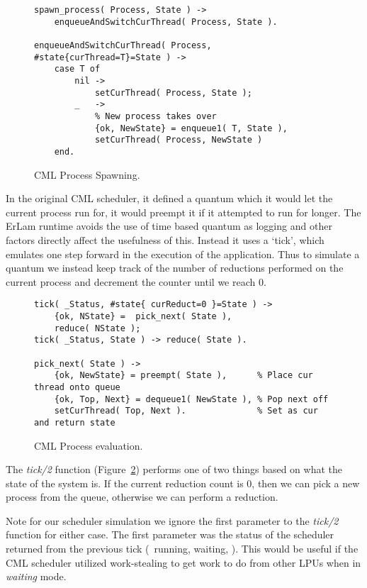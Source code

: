 \begin{figure}
\begin{verbatim}
spawn_process( Process, State ) -> 
    enqueueAndSwitchCurThread( Process, State ).

enqueueAndSwitchCurThread( Process, #state{curThread=T}=State ) ->
    case T of
        nil ->
            setCurThread( Process, State );
        _   ->
            % New process takes over
            {ok, NewState} = enqueue1( T, State ), 
            setCurThread( Process, NewState )
    end.
\end{verbatim}
\caption{CML Process Spawning.}
\label{fig:cml-spawn-process}
\end{figure}

In the original CML scheduler, it defined a quantum which it would let the 
current process run for, it would preempt it if it attempted to run 
for longer. The ErLam runtime avoids the use of time based quantum as logging 
and other factors directly affect the usefulness of this. Instead it uses a 
`tick', which emulates one
step forward in the execution of the application. Thus to simulate a quantum we
instead keep track of the number of reductions performed on the current process
and decrement the counter until we reach $0$.

\begin{figure}
\begin{verbatim}
tick( _Status, #state{ curReduct=0 }=State ) ->
    {ok, NState} =  pick_next( State ),
    reduce( NState );
tick( _Status, State ) -> reduce( State ).

pick_next( State ) ->
    {ok, NewState} = preempt( State ),      % Place cur thread onto queue
    {ok, Top, Next} = dequeue1( NewState ), % Pop next off
    setCurThread( Top, Next ).              % Set as cur and return state
\end{verbatim}
\caption{CML Process evaluation.}
\label{fig:cml-tick}
\end{figure}

The \emph{tick/2} function (Figure~\ref{fig:cml-tick}) performs one of two 
things based on what the state of the system is. If the current reduction count 
is $0$, then we can pick a new process from the queue, otherwise we can perform
a reduction. 

Note for our scheduler simulation we ignore the first parameter to the 
\emph{tick/2} function for either case. The first parameter was the status of 
the scheduler returned from the previous tick (\eg~running, waiting, \etc). This 
would be useful if the CML scheduler utilized work-stealing to get work to do
from other LPUs when in \emph{waiting} mode.

